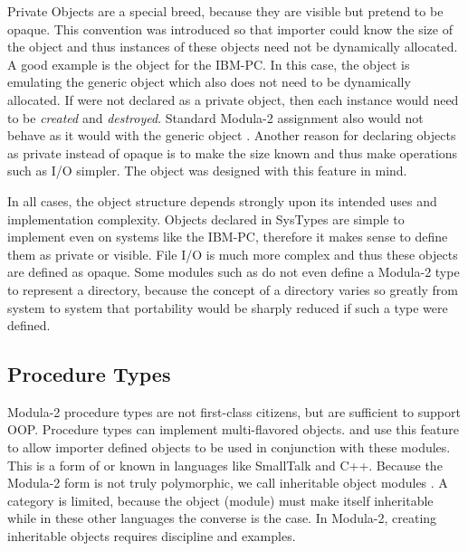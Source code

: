 Private Objects are a special breed, because they are visible but
pretend to be opaque.  This convention was introduced so that importer
could know the size of the object and thus instances of these objects
need not be dynamically allocated.  A good example is the object
 for the IBM-PC.  In this case, the object
is emulating the generic object  which also does not 
need to be dynamically allocated.  If  were
not declared as a private object, then each instance would need to
be {\em created} and {\em destroyed}.  Standard Modula-2 assignment 
also would not behave as it would with the generic object .
Another reason for declaring objects as private instead of opaque is
to make the size known and thus make operations such as I/O simpler.
The object  was designed with this feature in mind.

In all cases, the object structure depends strongly upon
its intended uses and implementation complexity.  Objects declared
in SysTypes are simple to implement even on systems like the IBM-PC,
therefore it makes sense to define them as private or visible.
File I/O is much more complex and thus these
objects are defined as opaque.  Some modules such as 
do not even define a Modula-2 type to represent a directory, because the
concept of a directory varies so greatly from system to system that
portability would be sharply reduced if such a type were defined.

\subsection{Procedure Types}

Modula-2 procedure types are not first-class citizens, but are 
sufficient to support OOP.  Procedure types can implement multi-flavored
objects.   and  use this feature to
allow importer defined objects to be used in conjunction with these
modules. This is a form of  or 
known in languages like SmallTalk and C++.  Because the Modula-2 form
is not truly polymorphic, we call inheritable object modules
.
A category is limited, because
the object (module) must make itself inheritable while in these other
languages the converse is the case.  In Modula-2, creating inheritable
objects requires discipline and examples.

